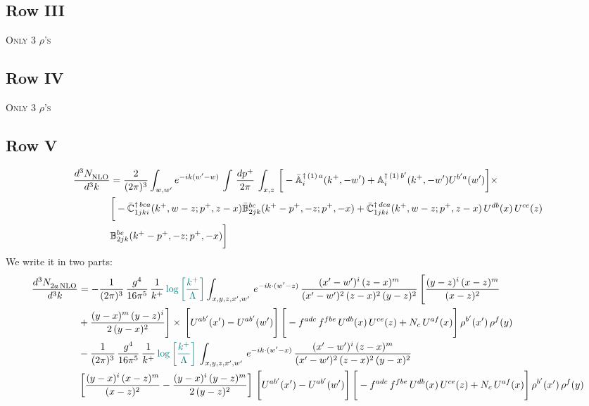 \documentclass[9pt]{article}
\def\mf#1{\mathbb{#1}}
\numberwithin{equation}{section}
\begin{document}
\subsection{Row III}
\textsc{Only 3 $\rho$'s}
\subsection{Row IV}
\textsc{Only 3 $\rho$'s}
\subsection{Row V}
\begin{align}
    \frac{d^{3}N_{\rm NLO}^{\rm}}{d^{3}k}  & = \frac{2}{(2\pi)^{3}}  \int_{w, w^\prime} e^{-ik(w^\prime-w)}\, \int\, \frac{dp^{+}}{2\pi}\,\int_{x,z}\, \bigg[-\bar{\mf{A}}^{\dagger\,(1)\,a}_{i}(k^{+},-w^{\prime})+\mf{A}^{\dagger\, (1)\, b^{\prime}}_{i}(k^{+},-w^{\prime})U^{b^{\prime}a}(w^{\prime})\bigg]\times\notag \\ & \bigg[-\Bar{\mf{C}}^{\dagger\, bca}_{1jki}(k^{+},w-z;p^{+},z-x)\Bar{\mf{B}}^{bc}_{2jk}(k^{+}-p^{+},- z;p^{+},-x)+\bar{\mf{C}}^{\dagger\, dca}_{1jki}(k^+,w-z; p^+, z-x)\,U^{db}(x)\,U^{ce}(z) \notag \\ & {\mf{B}}^{be}_{2jk} (k^{+}-p^+, -z; p^+, -x) \bigg]\nonumber
\end{align}
We write it in two parts: 
\begin{align}
    \frac{d^{3}N_{2a\,\rm NLO}^{\rm}}{d^{3}k}  & =   - \frac{1}{(2\pi)^{3}}\, \frac{g^{4}}{16\pi^{5}}\,\frac{1}{k^{+}}\,{\color{teal}\log{\left[\frac{k^{+}}{\Lambda}\right]}} \int_{x,y,z,x',w'}\, e^{-ik\cdot(w'-z)}\,\frac{(x'-w')^{i}\,(z-x)^{m}}{(x'-w')^{2}\,(z-x)^{2}\, (y-z)^{2}}\,\Bigg[\frac{(y-z)^{i}\,(x-z)^{m}}{(x-z)^{2}}\notag \\ & +\frac{(y-x)^{m}\,(y-z)^{i}}{2\,(y-x)^{2}}\Bigg]\times\, \Bigg[U^{ab'}(x')-U^{ab'}(w')\Bigg]\,\Bigg[-f^{adc}\,f^{fbe}\,U^{db}(x)\,U^{ce}(z)+N_{c}\,U^{af}(x)\Bigg]\,\rho^{b'}(x')\,\rho^{f}(y)\notag \\ & - \frac{1}{(2\pi)^{3}}\, \frac{g^{4}}{16\pi^{5}}\,\frac{1}{k^{+}}\,{\color{teal}\log{\left[\frac{k^{+}}{\Lambda}\right]}}\, \int_{x,y,z,x',w'}\,e^{-ik\cdot(w'-x)}\,\frac{(x'-w')^{i}\,(z-x)^{m}}{(x'-w')^{2}\,(z-x)^{2}\,(y-x)^{2}} \notag \\ &\left[\frac{(y-x)^{i}\,(x-z)^{m}}{(x-z)^{2}}-\frac{(y-x)^{i}\,(y-z)^{m}}{2\,(y-z)^{2}}\right]\, \Bigg[U^{ab'}(x')-U^{ab'}(w')\Bigg]\,\Bigg[-f^{adc}\,f^{fbe}\,U^{db}(x)\,U^{ce}(z)+N_{c}\,U^{af}(x)\Bigg]\,\rho^{b'}(x')\,\rho^{f}(y)
\end{align}
\end{document}
